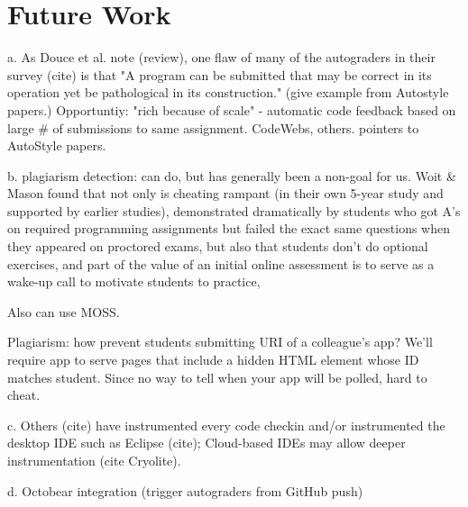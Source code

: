 \section{Future Work}



a.	As Douce et al. note (review), one flaw of many of the autograders in their survey (cite) is that "A program can be submitted that may be correct in its operation yet be pathological in its construction." (give example from Autostyle papers.) Opportuntiy: "rich because of scale" - automatic code feedback based on large # of submissions to same assignment.  CodeWebs, others. pointers to AutoStyle papers.

b.	plagiarism detection: can do, but has generally been a non-goal for us. Woit & Mason found that not only is cheating rampant (in their own 5-year study and supported by earlier studies), demonstrated dramatically by students who got A's on required programming assignments but failed the exact same questions when they appeared on proctored exams, but  also that students don't do optional exercises, and part of the value of an initial online assessment is to serve as a wake-up call to motivate students to practice,

Also can use MOSS.

Plagiarism: how prevent students submitting URI of a colleague's app?
We'll require app to serve pages that include a hidden HTML element
whose ID matches student.  Since no way to tell when your app will be
polled, hard to cheat.


c.	Others (cite) have instrumented every code checkin and/or instrumented the desktop IDE  such as Eclipse (cite); Cloud-based IDEs may allow deeper instrumentation (cite Cryolite).

d.	Octobear integration (trigger autograders from GitHub push)



